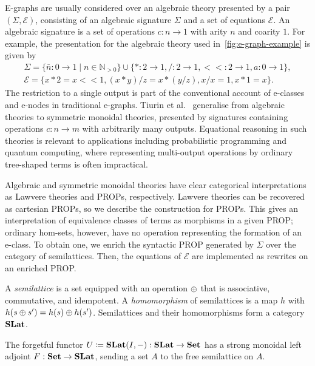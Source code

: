 E-graphs are usually considered over an algebraic theory presented by a pair $(\Sigma, \mathcal{E})$, consisting of an algebraic signature $\Sigma$ and a set of equations $\mathcal{E}$.
An algebraic signature is a set of operations $c : n \to 1$ with arity $n$ and coarity $1$.
For example, the presentation for the algebraic theory used in~\cref{fig:e-graph-example} is given by
\begin{gather*}
\Sigma = \{\bar{n} : 0 \to 1 \mid n \in \mathbb{N}_{> 0}\} \cup \{ * : 2 \to 1, / : 2 \to 1, <\!\!< : 2 \to 1, a : 0 \to 1\},\\
\mathcal{E} = \{x * 2 = x <\!\!<1, (x * y) / z =  x * (y / z), x / x = 1, x * 1 = x\}.
\end{gather*}
The restriction to a single output is part of the conventional account of e-classes and e-nodes in traditional e-graphs.
Tiurin et al.~\cite{tiurin2025equivalencehypergraphsdporewriting} generalise from algebraic theories to symmetric monoidal theories, presented by signatures containing operations $c : n \to m$ with arbitrarily many outputs.
Equational reasoning in such theories is relevant to applications including probabilistic programming and quantum computing, where representing multi-output operations by ordinary tree-shaped terms is often impractical.

Algebraic and symmetric monoidal theories have clear categorical interpretations as Lawvere theories and PROPs, respectively.
Lawvere theories can be recovered as cartesian PROPs, so we describe the construction for PROPs.
This gives an interpretation of equivalence classes of terms as morphisms in a given PROP; ordinary hom-sets, however, have no operation representing the formation of an e-class.
To obtain one, we enrich the syntactic PROP generated by $\Sigma$ over the category of semilattices.
Then, the equations of $\mathcal{E}$ are implemented as rewrites on an enriched PROP.

\begin{definition}[Semilattice]
	A \emph{semilattice} is a set equipped with an operation $\mathbin{\oplus}$ that is associative, commutative, and idempotent.
	A \emph{homomorphism} of semilattices is a map $h$ with $h(s \mathbin{\oplus} s') = h(s) \mathbin{\oplus} h(s')$.
	Semilattices and their homomorphisms form a category $\mathbf{SLat}$.
\end{definition}

\begin{proposition}
\label{prop:free_slat}
	The forgetful functor $U \coloneqq \mathbf{SLat}(I,-) : \mathbf{SLat} \to \mathbf{Set}$ has a strong monoidal left adjoint $F : \mathbf{Set} \to \mathbf{SLat}$, sending a set $A$ to the free semilattice on $A$.
\end{proposition}

